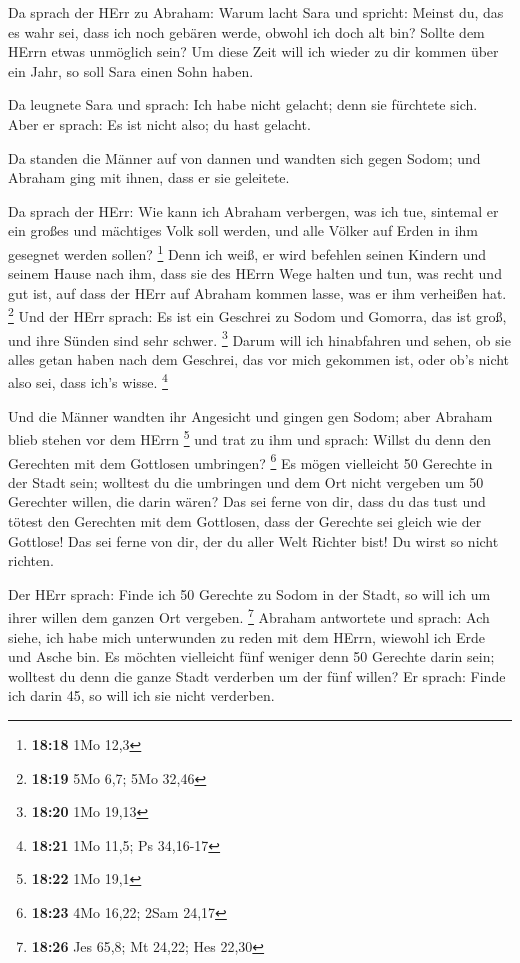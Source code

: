  Da sprach der HErr zu Abraham: Warum lacht Sara und
spricht: Meinst du, das es wahr sei, dass ich noch gebären werde, obwohl
ich doch alt bin?  Sollte dem HErrn etwas unmöglich sein?
Um diese Zeit will ich wieder zu dir kommen über ein Jahr, so soll Sara
einen Sohn haben.

 Da leugnete Sara und sprach: Ich habe nicht gelacht; denn
sie fürchtete sich. Aber er sprach: Es ist nicht also; du hast gelacht.

 Da standen die Männer auf von dannen und wandten sich
gegen Sodom; und Abraham ging mit ihnen, dass er sie geleitete.

 Da sprach der HErr: Wie kann ich Abraham verbergen, was
ich tue,  sintemal er ein großes und mächtiges Volk soll
werden, und alle Völker auf Erden in ihm gesegnet werden sollen?
\footnote{\textbf{18:18} 1Mo 12,3}  Denn ich weiß, er wird
befehlen seinen Kindern und seinem Hause nach ihm, dass sie des HErrn
Wege halten und tun, was recht und gut ist, auf dass der HErr auf
Abraham kommen lasse, was er ihm verheißen hat. \footnote{\textbf{18:19}
  5Mo 6,7; 5Mo 32,46}  Und der HErr sprach: Es ist ein
Geschrei zu Sodom und Gomorra, das ist groß, und ihre Sünden sind sehr
schwer. \footnote{\textbf{18:20} 1Mo 19,13}  Darum will ich
hinabfahren und sehen, ob sie alles getan haben nach dem Geschrei, das
vor mich gekommen ist, oder ob's nicht also sei, dass ich's wisse.
\footnote{\textbf{18:21} 1Mo 11,5; Ps 34,16-17}

 Und die Männer wandten ihr Angesicht und gingen gen Sodom;
aber Abraham blieb stehen vor dem HErrn \footnote{\textbf{18:22} 1Mo
  19,1}  und trat zu ihm und sprach: Willst du denn den
Gerechten mit dem Gottlosen umbringen? \footnote{\textbf{18:23} 4Mo
  16,22; 2Sam 24,17}  Es mögen vielleicht 50 Gerechte in
der Stadt sein; wolltest du die umbringen und dem Ort nicht vergeben um
50 Gerechter willen, die darin wären?  Das sei ferne von
dir, dass du das tust und tötest den Gerechten mit dem Gottlosen, dass
der Gerechte sei gleich wie der Gottlose! Das sei ferne von dir, der du
aller Welt Richter bist! Du wirst so nicht richten.

 Der HErr sprach: Finde ich 50 Gerechte zu Sodom in der
Stadt, so will ich um ihrer willen dem ganzen Ort vergeben. \footnote{\textbf{18:26}
  Jes 65,8; Mt 24,22; Hes 22,30}  Abraham antwortete und
sprach: Ach siehe, ich habe mich unterwunden zu reden mit dem HErrn,
wiewohl ich Erde und Asche bin.  Es möchten vielleicht fünf
weniger denn 50 Gerechte darin sein; wolltest du denn die ganze Stadt
verderben um der fünf willen? Er sprach: Finde ich darin 45, so will ich
sie nicht verderben.

